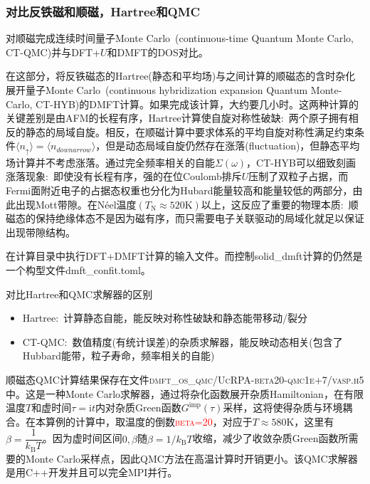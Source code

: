 \subsubsection{对比反铁磁和顺磁，\textrm{Hartree}和\textrm{QMC}}
对顺磁完成连续时间量子\textrm{Monte Carlo~(continuous-time Quantum Monte Carlo, CT-QMC)}并与\textrm{DFT+}$U$和\textrm{DMFT}的\textrm{DOS}对比。

在这部分，将反铁磁态的\textrm{Hartree}(静态和平均场)与之间计算的顺磁态的含时杂化展开量子\textrm{Monte Carlo~(continuous hybridization expansion Quantum Monte-Carlo, CT-HYB)}的\textrm{DMFT}计算。如果完成该计算，大约要几小时。这两种计算的关键差别是由\textrm{AFM}的长程有序，\textrm{Hartree}计算使自旋对称性破缺:~两个原子拥有相反的静态的局域自旋。相反，在顺磁计算中要求体系的平均自旋对称性满足约束条件$\langle n_{\uparrow}\rangle=\langle n_{downarrow}\rangle$，但是动态局域自旋仍然存在涨落\textrm{(fluctuation)}，但静态平均场计算并不考虑涨落。通过完全频率相关的自能$\Sigma(\omega)$，\textrm{CT-HYB}可以细致刻画涨落现象:~即使没有长程有序，强的在位\textrm{Coulomb}排斥$U$压制了双粒子占据，而\textrm{Fermi}面附近电子的占据态权重也分化为\textrm{Hubard}能量较高和能量较低的两部分，由此出现\textrm{Mott}带隙。在\textrm{N\'eel}温度$(T_{\mathrm{N}}\approx520\mathrm{K})$以上，这反应了重要的物理本质:~顺磁态的保持绝缘体态不是因为磁有序，而只需要电子关联驱动的局域化就足以保证出现带隙结构。

在计算目录中执行\textrm{DFT+DMFT}计算的输入文件。而控制\textrm{solid\_dmft}计算的仍然是一个构型文件\textrm{dmft\_confit.toml}。

对比\textrm{Hartree}和\textrm{QMC}求解器的区别
\begin{itemize}
	\item \textrm{Hartree}:~计算静态自能，能反映对称性破缺和静态能带移动/裂分
	\item \textrm{CT-QMC}:~数值精度(有统计误差)的杂质求解器，能反映动态相关(包含了\textrm{Hubbard}能带，粒子寿命，频率相关的自能)
\end{itemize}
顺磁态\textrm{QMC}计算结果保存在文件\textsc{dmft\_os\_qmc/UcRPA-beta20-qmc1e+7/vasp.h5}中。这是一种\textrm{Monte Carlo}求解器，通过将杂化函数展开杂质\textrm{Hamiltonian}，在有限温度$T$和虚时间$\tau=\mathrm{i}t$内对杂质\textrm{Green}函数$G^{\mathrm{imp}}(\tau)$采样，这将使得杂质与环境耦合。在本算例的计算中，取温度的倒数\textcolor{red}{\textsc{beta}=20}，对应于$T\approx580\mathrm{K}$，这里有$\beta=\dfrac1{k_{\mathrm{B}}T}$。因为虚时间区间$0,\beta$随$\beta=1/k_{\mathrm{B}}T$收缩，减少了收敛杂质\textrm{Green}函数所需要的\textrm{Monte Carlo}采样点，因此\textrm{QMC}方法在高温计算时开销更小。该\textrm{QMC}求解器是用\textrm{C++}开发并且可以完全\textrm{MPI}并行。

